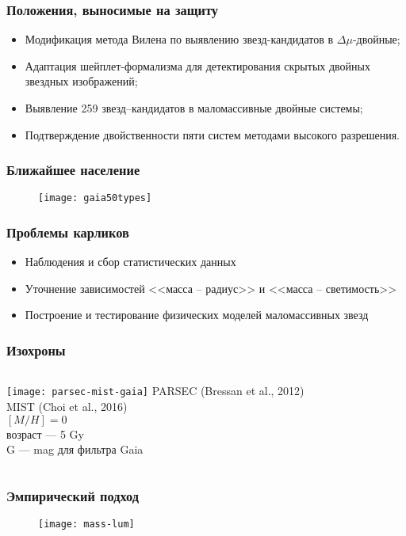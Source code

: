 \begin{frame}
    \frametitle{Положения, выносимые на защиту}
    \begin{itemize}
  		\item Модификация метода Вилена по выявлению звезд-кандидатов в $\Delta\mu$-двойные;
  		\item Адаптация шейплет-формализма для детектирования скрытых двойных звездных изображений;
  		\item Выявление 259 звезд--кандидатов в маломассивные двойные системы;
  		\item Подтверждение двойственности пяти систем методами высокого разрешения.
    \end{itemize}
\end{frame}

\begin{frame}
\frametitle{Ближайшее население}
\begin{figure}[pt]
  \centering
   \texttt{[image: gaia50types]}
\end{figure}
\end{frame}

\begin{frame}
\frametitle{Проблемы карликов}
\begin{itemize}
  \item Наблюдения и сбор статистических данных
  \item Уточнение зависимостей <<масса -- радиус>> и <<масса -- светимость>>
  \item Построение и тестирование физических моделей маломассивных звезд
\end{itemize}
\end{frame}

\begin{frame}
\frametitle{Изохроны}
\begin{columns}
	\texttt{[image: parsec-mist-gaia]}
 {\scriptsize PARSEC (Bressan et al., 2012)} \\
 {\scriptsize MIST (Choi et al., 2016)} \\
 {\scriptsize $[M/H]=0$} \\
 {\scriptsize возраст --- 5 Gy} \\
 {\scriptsize G --- mag для фильтра Gaia} \\
\end{columns}
\end{frame}

\begin{frame}
\frametitle{Эмпирический подход}
\begin{figure}[pt]
  \centering
  \texttt{[image: mass-lum]}
\end{figure}
\end{frame}


